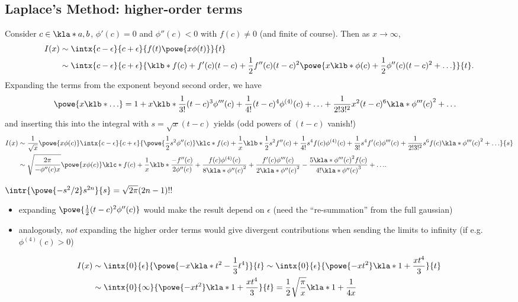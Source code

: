 \documentclass[english, parskip=full]{scrbook}
\newcommand{\note}[1]{\begin{tcolorbox}[colback=colorbackgroundnote,colframe=colornote, breakable,enhanced]#1\end{tcolorbox}}
\newcommand{\example}[3]{\begin{tcolorbox}[colback=colorbackgroundexample,colframe=colorexample, breakable,enhanced,title={\textbf{#1}: #2.}]#3\end{tcolorbox}}
\begin{document}
\subsection{Laplace's Method: higher-order terms}
Consider $c\in\kla*{a,b}$, $\phi'(c)=0$ and $\phi''(c)<0$ with $f(c)\neq 0$ (and finite of course).
Then as $x\rightarrow\infty$,
\begin{align}
I(x) &\sim \intx{c-\epsilon}{c+\epsilon}{f(t) \powe{x\phi(t)}}{t}\\
&\sim \intx{c-\epsilon}{c+\epsilon}{\klb*{f(c) + f'(c)(t-c) + \frac{1}{2} f''(c)(t-c)^2} \powe{x\klb*{\phi(c) + \frac{1}{2} \phi''(c) (t-c)^2 + \dots}}}{t}.
\end{align}
Expanding the terms from the exponent beyond second order, we have
\begin{align}
\powe{x\klb*{\dots}} &= 1 + x \klb*{\frac{1}{3!} (t-c)^3 \phi'''(c) + \frac{1}{4!} (t-c)^4 \phi^{(4)}(c) + \dots} + \frac{1}{2! 3!^2} x^2 (t-c)^6 \kla*{\phi'''(c)}^2 + \dots
\end{align}
and inserting this into the integral with $s=\sqrt{x}(t-c)$ yields (odd powers of $(t-c)$ vanish!)
\begin{align}
I(x) &\sim \frac{1}{\sqrt{x}} \powe{x\phi(c)} \intx{c-\epsilon}{c+\epsilon}{\powe{\frac{1}{2} s^2\phi''(c)} \klc*{f(c) + \frac{1}{x} \klb*{\frac{1}{2}s^2 f''(c) + \frac{1}{4!} s^4 f(c) \phi^{(4)}(c) + \frac{1}{3!} s^4 f'(c) \phi'''(c) + \frac{1}{2!3!^2} s^6 f(c) \kla*{\phi'''(c)}^2 + \dots}} }{s}\\
&\sim \sqrt{\frac{2\pi}{-\phi''(c)x}} \powe{x\phi(c)} \klc*{f(c) + \frac{1}{x}\klb*{\frac{-f''(c)}{2\phi''(c)} + \frac{f(c)\phi^{(4)}(c)}{8\kla*{\phi''(c)}^2} + \frac{f'(c)\phi'''(c)}{2\kla*{\phi''(c)}^2} - \frac{5\kla*{\phi'''(c)}^2 f(c)}{4! \kla*{\phi''(c)}^3} + \dots}}.
\end{align}
\note{$\intr{\powe{-s^2/2} s^{2n}}{s} = \sqrt{2\pi} (2n-1)!!$}
\note{\begin{itemize}
\item expanding $\powe{\frac{1}{2}(t-c)^2\phi''(c)}$ would make the result depend on $\epsilon$ (need the ``re-summation'' from the full gaussian)
\item analogously, \emph{not} expanding the higher order terms would give divergent contributions when sending the limits to infinity (if e.g. $\phi^{(4)}(c) > 0$)
\end{itemize}}
\example{Exponential trig integral}{$I(x) = \intx{0}{\pi/2}{\powe{-x\sin(t)^2}}{t}$ as $x\rightarrow\infty$}{\begin{align}
I(x) &\sim \intx{0}{\epsilon}{\powe{-x\kla*{t^2-\frac{1}{3}t^4}}}{t} \sim \intx{0}{\epsilon}{\powe{-xt^2} \kla*{1 + \frac{xt^4}{3}}}{t}\\
&\sim \intx{0}{\infty}{\powe{-xt^2} \kla*{1 + \frac{xt^4}{3}}}{t} = \frac{1}{2} \sqrt{\frac{\pi}{x}} \kla*{1 + \frac{1}{4x}}
\end{align}
}
\end{document}
